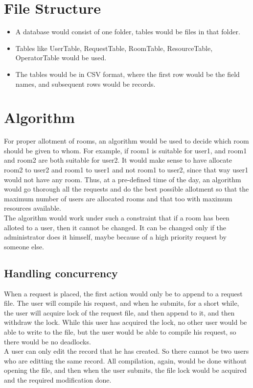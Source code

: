 \documentclass[11pt,a4paper,oneside]{report}
\begin{document}
\section{File Structure}
\begin{itemize}
\item{A database would consist of one folder, tables would be files in that folder.}
\item{Tables like UserTable, RequestTable, RoomTable, ResourceTable, OperatorTable would be used.}
\item{The tables would be in CSV format, where the first row would be the field names, and subsequent rows would be records.}

\end{itemize}
\section{Algorithm}
For proper allotment of rooms, an algorithm would be used to decide which room should be given to whom. For example, if room1 is suitable for user1, and room1 and room2 are both suitable for user2. It would make sense to have allocate room2 to user2 and room1 to user1 and not room1 to user2, since that way user1 would not have any room. Thus, at a pre-defined time of the day, an algorithm would go thorough all the requests and do the best possible allotment so that the maximum number of users are allocated rooms and that too with maximum resources available.  \\

The algorithm would work under such a constraint that if a room has been alloted to a user, then it cannot be changed. It can be changed only if the administrator does it himself, maybe because of a high priority request by someone else.

\subsection{Handling concurrency}
When a request is placed, the first action would only be to append to a request file. The user will compile his request, and when he submits, for a short while, the user will acquire lock of the request file, and then append to it, and then withdraw the lock. While this user has acquired the lock, no other user would be able to write to the file, but the user would be able to compile his request, so there would be no deadlocks. \\
A user can only edit the record that he has created. So there cannot be two users who are editting the same record. All compilation, again, would be done without opening the file, and then when the user submits, the file lock would be acquired and the required modification done.
\end{document}
